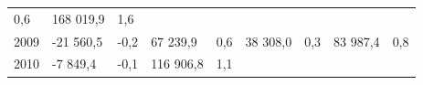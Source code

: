 \begin{longtable}[]{@{}lllllllll@{}}
\begin{minipage}[t]{0.06\columnwidth}
0,6\strut
\end{minipage} & \begin{minipage}[t]{0.08\columnwidth}\raggedright
168 019,9\strut
\end{minipage} & \begin{minipage}[t]{0.06\columnwidth}\raggedright
1,6\strut
\end{minipage}\tabularnewline
\begin{minipage}[t]{0.05\columnwidth}\raggedright
2009\strut
\end{minipage} & \begin{minipage}[t]{0.10\columnwidth}\raggedright
-21 560,5\strut
\end{minipage} & \begin{minipage}[t]{0.06\columnwidth}\raggedright
-0,2\strut
\end{minipage} & \begin{minipage}[t]{0.17\columnwidth}\raggedright
67 239,9\strut
\end{minipage} & \begin{minipage}[t]{0.06\columnwidth}\raggedright
0,6\strut
\end{minipage} & \begin{minipage}[t]{0.12\columnwidth}\raggedright
38 308,0\strut
\end{minipage} & \begin{minipage}[t]{0.06\columnwidth}\raggedright
0,3\strut
\end{minipage} & \begin{minipage}[t]{0.08\columnwidth}\raggedright
83 987,4\strut
\end{minipage} & \begin{minipage}[t]{0.06\columnwidth}\raggedright
0,8\strut
\end{minipage}\tabularnewline
\begin{minipage}[t]{0.05\columnwidth}\raggedright
2010\strut
\end{minipage} & \begin{minipage}[t]{0.10\columnwidth}\raggedright
-7 849,4\strut
\end{minipage} & \begin{minipage}[t]{0.06\columnwidth}\raggedright
-0,1\strut
\end{minipage} & \begin{minipage}[t]{0.17\columnwidth}\raggedright
116 906,8\strut
\end{minipage} & \begin{minipage}[t]{0.06\columnwidth}\raggedright
1,1\strut
\end{minipage} & \begin{minipage}[t]{0.12\columnwidth}\raggedright

\end{minipage}
\end{longtable}
